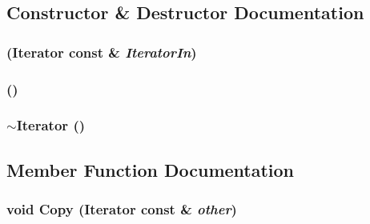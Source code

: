 \subsection{Constructor \& Destructor Documentation}
\hypertarget{classJKBuilder_1_1Iterator_a73347fde83464fe47afb15d2e34d86ad}{
\subsubsection[{Iterator}]{ ({\bf Iterator} const \& {\em IteratorIn})}}
\label{classJKBuilder_1_1Iterator_a73347fde83464fe47afb15d2e34d86ad}
\hypertarget{classJKBuilder_1_1Iterator_a1f703720e1f5d97a0386c2dfe803c763}{
\subsubsection[{Iterator}]{ ()}}
\label{classJKBuilder_1_1Iterator_a1f703720e1f5d97a0386c2dfe803c763}
\hypertarget{classJKBuilder_1_1Iterator_a844b82815a73859e781b4798eb82f221}{
\subsubsection[{$\sim$Iterator}]{\setlength{\rightskip}{0pt plus 5cm}$\sim${\bf Iterator} ()}}
\label{classJKBuilder_1_1Iterator_a844b82815a73859e781b4798eb82f221}


\subsection{Member Function Documentation}
\hypertarget{classJKBuilder_1_1Iterator_aacb7559eb1b8aab6e7bb6a56602d97ff}{
\subsubsection[{Copy}]{\setlength{\rightskip}{0pt plus 5cm}void Copy ({\bf Iterator} const \& {\em other})}}
\label{classJKBuilder_1_1Iterator_aacb7559eb1b8aab6e7bb6a56602d97ff}



